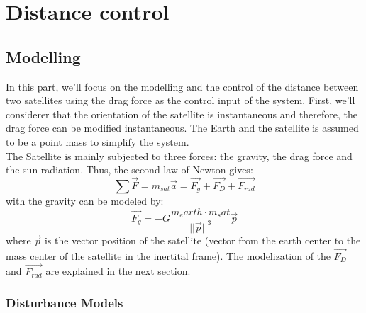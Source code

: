 \part{Distance control}

\chapter{Modelling}
In this part, we'll focus on the modelling and the control of the distance between two satellites using the drag force as the control input of the system. First, we'll considerer that the orientation of the satellite is instantaneous and therefore, the drag force can be modified instantaneous. The Earth and the satellite is assumed to be a point mass to simplify the system. \\
The Satellite is mainly subjected to three forces: the gravity, the drag force and the sun radiation. Thus, the second law of Newton gives:
\[
\sum \vec{F} = m_{sat} \vec{a} = \vec{F_g} + \vec{F_D} + \vec{F_{rad}}
\]
with the gravity can be modeled by:
\[
\vec{F_g} = -G\frac{m_earth \cdot m_sat}{||\vec{p}||^3} \vec{p}
\]
where $\vec{p}$ is the vector position of the satellite (vector from the earth center to the mass center of the satellite in the inertital frame). The modelization of the $\vec{F_D}$ and $\vec{F_{rad}}$ are explained in the next section.
\section{Disturbance Models}

